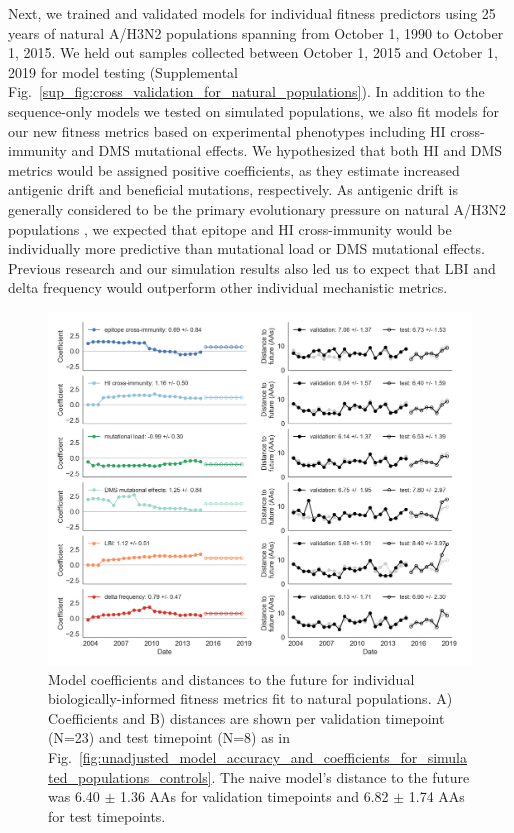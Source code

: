 Next, we trained and validated models for individual fitness predictors using 25 years of natural A/H3N2 populations spanning from October 1, 1990 to October 1, 2015.
We held out samples collected between October 1, 2015 and October 1, 2019 for model testing (Supplemental Fig.~\ref{sup_fig:cross_validation_for_natural_populations}).
In addition to the sequence-only models we tested on simulated populations, we also fit models for our new fitness metrics based on experimental phenotypes including HI cross-immunity and DMS mutational effects.
We hypothesized that both HI and DMS metrics would be assigned positive coefficients, as they estimate increased antigenic drift and beneficial mutations, respectively.
As antigenic drift is generally considered to be the primary evolutionary pressure on natural A/H3N2 populations \cite{Smith:2004jc,Bedford:2014bf,Luksza:2014hj}, we expected that epitope and HI cross-immunity would be individually more predictive than mutational load or DMS mutational effects.
Previous research \cite{Neher:2016hy} and our simulation results also led us to expect that LBI and delta frequency would outperform other individual mechanistic metrics.

\begin{figure}[ht]
  \begin{center}
  \includegraphics[width=\textwidth]{figures/unadjusted-model-accuracy-and-coefficients-for-natural-populations.png}
  \caption{
    Model coefficients and distances to the future for individual biologically-informed fitness metrics fit to natural populations.
    A) Coefficients and B) distances are shown per validation timepoint (N=23) and test timepoint (N=8) as in Fig.~\ref{fig:unadjusted_model_accuracy_and_coefficients_for_simulated_populations_controls}.
    The naive model's distance to the future was 6.40 $\pm$ 1.36 AAs for validation timepoints and 6.82 $\pm$ 1.74 AAs for test timepoints.
  }
  \label{fig:unadjusted_model_accuracy_and_coefficients_for_natural_populations}
  \end{center}
\end{figure}

